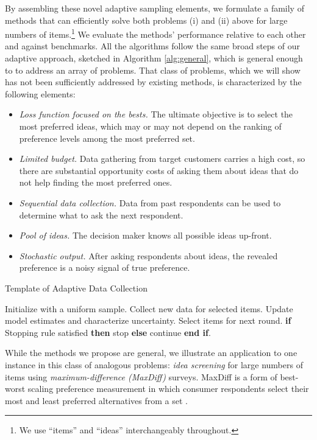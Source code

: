 \documentclass[nonblindrev]{informs3}
\begin{document}
By assembling these novel adaptive sampling elements, we formulate a family of methods that can efficiently solve both problems (i) and (ii) above for large numbers of items.\footnote{We use ``items'' and ``ideas'' interchangeably throughout.} We evaluate the methods' performance relative to each other and against benchmarks. All the algorithms follow the same broad steps of our adaptive approach, sketched in Algorithm \ref{alg:general}, which is general enough to to address an array of problems. That class of problems, which we will show has not been sufficiently addressed by existing methods, is characterized by the following elements:
\begin{itemize}
\item \emph{Loss function focused on the bests.} The ultimate objective is to select the most preferred ideas, which may or may not depend on the ranking of preference levels among the most preferred set.
\item \emph{Limited budget.} Data gathering from target customers carries a high cost, so there are substantial opportunity costs of asking them about ideas that do not help finding the most preferred ones.
\item \emph{Sequential data collection.} Data from past respondents can be used to determine what to ask the next respondent.
\item \emph{Pool of ideas.} The decision maker knows all possible ideas up-front.
\item \emph{Stochastic output.} After asking respondents about ideas, the revealed preference is a noisy signal of true preference.
\end{itemize}

\begin{algorithm} 
\caption{Template of Adaptive Data Collection} \label{alg:general}
\begin{algorithmic}[1]
\State Initialize with a uniform sample.
\State Collect new data for selected items.
\State Update model estimates and characterize uncertainty.
\State Select items for next round.
\State \textbf{if} {Stopping rule satisfied} \textbf{then} stop \textbf{else} continue \textbf{end if}.
\EndFor
\end{algorithmic}
\end{algorithm}

While the methods we propose are general, we illustrate an application to one instance in this class of analogous problems: \emph{idea screening} for large numbers of items using \emph{maximum-difference (MaxDiff)} surveys. MaxDiff is a form of best-worst scaling preference measurement in which consumer respondents select their most and least preferred alternatives from a set \citep{marley2005some}.
\end{document}

